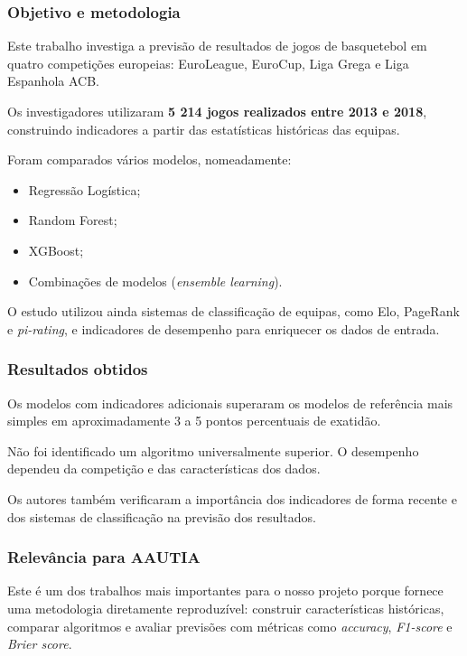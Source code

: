 \subsubsection{Objetivo e metodologia}\label{aautia:objetivo-e-metodologia}

Este trabalho investiga a previsão de resultados de jogos de basquetebol
em quatro competições europeias: EuroLeague, EuroCup, Liga Grega e Liga
Espanhola ACB.

Os investigadores utilizaram \textbf{5 214 jogos realizados entre 2013 e
2018}, construindo indicadores a partir das estatísticas históricas das
equipas.

Foram comparados vários modelos, nomeadamente:

\begin{itemize}
\tightlist
\item
  Regressão Logística;
\item
  Random Forest;
\item
  XGBoost;
\item
  Combinações de modelos (\emph{ensemble learning}).
\end{itemize}

O estudo utilizou ainda sistemas de classificação de equipas, como Elo,
PageRank e \emph{pi-rating}, e indicadores de desempenho para enriquecer
os dados de entrada.

\subsubsection{Resultados obtidos}\label{aautia:resultados-obtidos}

Os modelos com indicadores adicionais superaram os modelos de referência
mais simples em aproximadamente 3 a 5 pontos percentuais de exatidão.

Não foi identificado um algoritmo universalmente superior. O desempenho
dependeu da competição e das características dos dados.

Os autores também verificaram a importância dos indicadores de forma
recente e dos sistemas de classificação na previsão dos resultados.

\subsubsection{Relevância para AAUTIA}\label{aautia:relevuxe2ncia-para-aautia}

Este é um dos trabalhos mais importantes para o nosso projeto porque
fornece uma metodologia diretamente reproduzível: construir
características históricas, comparar algoritmos e avaliar previsões com
métricas como \emph{accuracy}, \emph{F1-score} e \emph{Brier score}.

